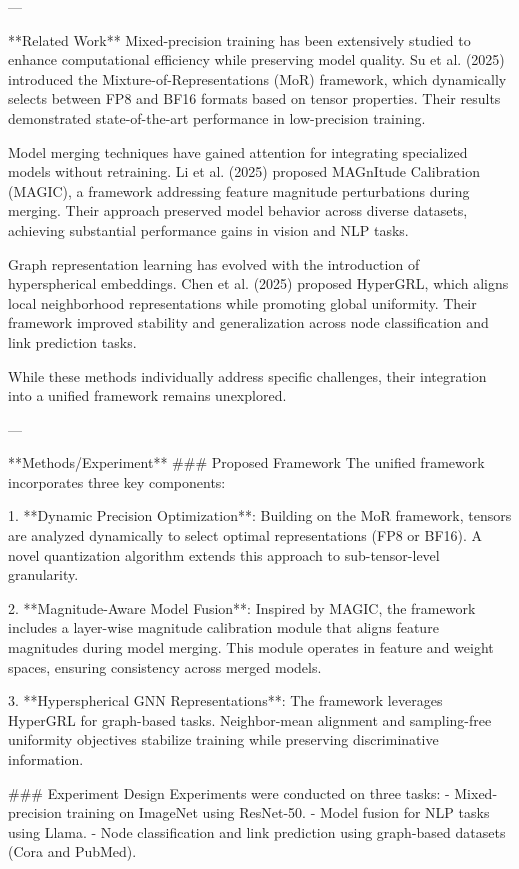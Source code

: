 ---

**Related Work**  
Mixed-precision training has been extensively studied to enhance computational efficiency while preserving model quality. Su et al. (2025) introduced the Mixture-of-Representations (MoR) framework, which dynamically selects between FP8 and BF16 formats based on tensor properties. Their results demonstrated state-of-the-art performance in low-precision training.  

Model merging techniques have gained attention for integrating specialized models without retraining. Li et al. (2025) proposed MAGnItude Calibration (MAGIC), a framework addressing feature magnitude perturbations during merging. Their approach preserved model behavior across diverse datasets, achieving substantial performance gains in vision and NLP tasks.  

Graph representation learning has evolved with the introduction of hyperspherical embeddings. Chen et al. (2025) proposed HyperGRL, which aligns local neighborhood representations while promoting global uniformity. Their framework improved stability and generalization across node classification and link prediction tasks.  

While these methods individually address specific challenges, their integration into a unified framework remains unexplored.  

---

**Methods/Experiment**  
### Proposed Framework  
The unified framework incorporates three key components:  

1. **Dynamic Precision Optimization**: Building on the MoR framework, tensors are analyzed dynamically to select optimal representations (FP8 or BF16). A novel quantization algorithm extends this approach to sub-tensor-level granularity.  

2. **Magnitude-Aware Model Fusion**: Inspired by MAGIC, the framework includes a layer-wise magnitude calibration module that aligns feature magnitudes during model merging. This module operates in feature and weight spaces, ensuring consistency across merged models.  

3. **Hyperspherical GNN Representations**: The framework leverages HyperGRL for graph-based tasks. Neighbor-mean alignment and sampling-free uniformity objectives stabilize training while preserving discriminative information.  

### Experiment Design  
Experiments were conducted on three tasks:  
- Mixed-precision training on ImageNet using ResNet-50.  
- Model fusion for NLP tasks using Llama.  
- Node classification and link prediction using graph-based datasets (Cora and PubMed).  

